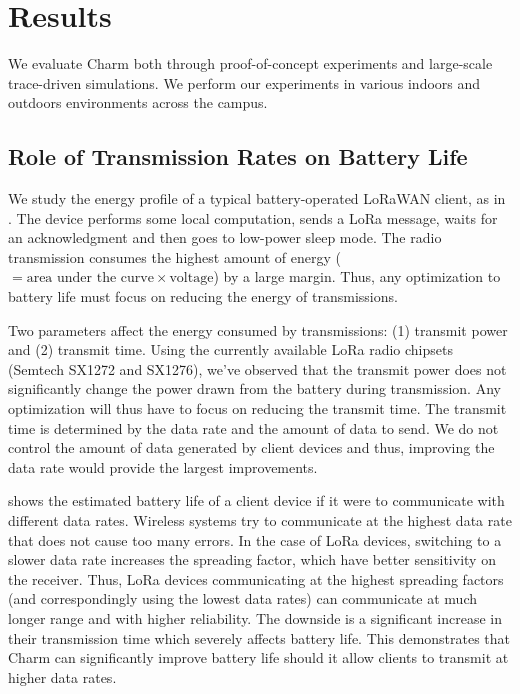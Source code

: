 


\section{Results}
\label{sec:eval}


We evaluate Charm both through proof-of-concept experiments and large-scale
trace-driven simulations. We perform our experiments in various indoors and
outdoors environments across the campus.

\subsection{Role of Transmission Rates on Battery Life}
\label{sec:energy-savings}

We study the energy profile of a typical battery-operated LoRaWAN client, as
in . The device performs some local computation, sends a
LoRa message, waits for an acknowledgment and then goes to low-power sleep
mode. The radio transmission consumes the highest amount of energy ($=
\text{area under the curve} \times \text{voltage}$) by a large margin. Thus,
any optimization to battery life must focus on reducing the energy of
transmissions.

Two parameters affect the energy consumed by transmissions: (1) transmit power
and (2) transmit time. Using the currently available LoRa radio chipsets
(Semtech SX1272 and SX1276), we've observed that the transmit power does not
significantly change the power drawn from the battery during transmission. Any
optimization will thus have to focus on reducing the transmit time. The
transmit time is determined by the data rate and the amount of data to send.
We do not control the amount of data generated by client devices and thus,
improving the data rate would provide the largest improvements.

 shows the estimated battery life of a client
device if it were to communicate with different data rates. Wireless systems
try to communicate at the highest data rate that does not cause too many
errors. In the case of LoRa devices, switching to a slower data rate increases
the spreading factor,  which have better sensitivity on the receiver. Thus,
LoRa devices communicating at the highest spreading factors (and
correspondingly using the lowest data rates) can communicate at much longer
range and with higher reliability. The downside is a significant increase in
their transmission time which severely affects battery life. This demonstrates
that Charm can significantly improve battery life should it allow clients to
transmit at higher data rates.

